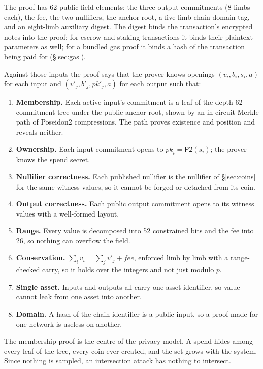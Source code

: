 \documentclass[twocolumn,10pt]{article}
\begin{document}
The proof has 62 public field elements: the three output commitments (8 limbs each), the fee, the two nullifiers, the anchor root, a five-limb chain-domain tag, and an eight-limb auxiliary digest. The digest binds the transaction's encrypted notes into the proof; for escrow and staking transactions it binds their plaintext parameters as well; for a bundled gas proof it binds a hash of the transaction being paid for (\S\ref{sec:gas}).

Against those inputs the proof says that the prover knows openings $(v_i, b_i, s_i, a)$ for each input and $(v'_j, b'_j, \mathit{pk}'_j, a)$ for each output such that:

\begin{enumerate}
\item \textbf{Membership.} Each active input's commitment is a leaf of the depth-62 commitment tree under the public anchor root, shown by an in-circuit Merkle path of Poseidon2 compressions. The path proves existence and position and reveals neither.
\item \textbf{Ownership.} Each input commitment opens to $\mathit{pk}_i = \mathsf{P2}(s_i)$; the prover knows the spend secret.
\item \textbf{Nullifier correctness.} Each published nullifier is the nullifier of \S\ref{sec:coins} for the same witness values, so it cannot be forged or detached from its coin.
\item \textbf{Output correctness.} Each public output commitment opens to its witness values with a well-formed layout.
\item \textbf{Range.} Every value is decomposed into 52 constrained bits and the fee into 26, so nothing can overflow the field.
\item \textbf{Conservation.} $\sum_i v_i = \sum_j v'_j + \mathit{fee}$, enforced limb by limb with a range-checked carry, so it holds over the integers and not just modulo $p$.
\item \textbf{Single asset.} Inputs and outputs all carry one asset identifier, so value cannot leak from one asset into another.
\item \textbf{Domain.} A hash of the chain identifier is a public input, so a proof made for one network is useless on another.
\end{enumerate}

The membership proof is the centre of the privacy model. A spend hides among every leaf of the tree, every coin ever created, and the set grows with the system. Since nothing is sampled, an intersection attack has nothing to intersect.
\end{document}
